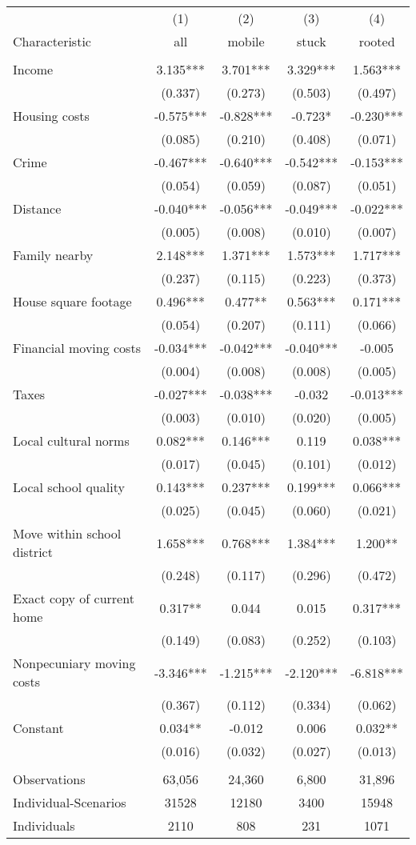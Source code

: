 \begin{tabular}{lcccc} \hline
 & (1) & (2) & (3) & (4) \\
Characteristic & all & mobile & stuck & rooted \\ \hline
 &  &  &  &  \\
Income & 3.135*** & 3.701*** & 3.329*** & 1.563*** \\
 & (0.337) & (0.273) & (0.503) & (0.497) \\
Housing costs & -0.575*** & -0.828*** & -0.723* & -0.230*** \\
 & (0.085) & (0.210) & (0.408) & (0.071) \\
Crime & -0.467*** & -0.640*** & -0.542*** & -0.153*** \\
 & (0.054) & (0.059) & (0.087) & (0.051) \\
Distance & -0.040*** & -0.056*** & -0.049*** & -0.022*** \\
 & (0.005) & (0.008) & (0.010) & (0.007) \\
Family nearby & 2.148*** & 1.371*** & 1.573*** & 1.717*** \\
 & (0.237) & (0.115) & (0.223) & (0.373) \\
House square footage & 0.496*** & 0.477** & 0.563*** & 0.171*** \\
 & (0.054) & (0.207) & (0.111) & (0.066) \\
Financial moving costs & -0.034*** & -0.042*** & -0.040*** & -0.005 \\
 & (0.004) & (0.008) & (0.008) & (0.005) \\
Taxes & -0.027*** & -0.038*** & -0.032 & -0.013*** \\
 & (0.003) & (0.010) & (0.020) & (0.005) \\
Local cultural norms & 0.082*** & 0.146*** & 0.119 & 0.038*** \\
 & (0.017) & (0.045) & (0.101) & (0.012) \\
Local school quality & 0.143*** & 0.237*** & 0.199*** & 0.066*** \\
 & (0.025) & (0.045) & (0.060) & (0.021) \\
Move within school district & 1.658*** & 0.768*** & 1.384*** & 1.200** \\
 & (0.248) & (0.117) & (0.296) & (0.472) \\
Exact copy of current home & 0.317** & 0.044 & 0.015 & 0.317*** \\
 & (0.149) & (0.083) & (0.252) & (0.103) \\
Nonpecuniary moving costs & -3.346*** & -1.215*** & -2.120*** & -6.818*** \\
 & (0.367) & (0.112) & (0.334) & (0.062) \\
Constant & 0.034** & -0.012 & 0.006 & 0.032** \\
 & (0.016) & (0.032) & (0.027) & (0.013) \\
 &  &  &  &  \\
Observations & 63,056 & 24,360 & 6,800 & 31,896 \\
Individual-Scenarios & 31528 & 12180 & 3400 & 15948 \\
 Individuals & 2110 & 808 & 231 & 1071 \\ \hline
\end{tabular}
